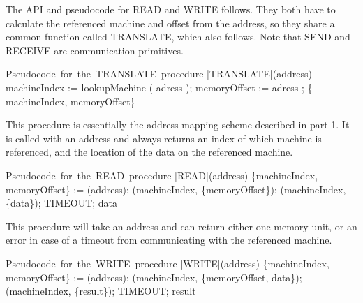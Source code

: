 \documentclass[11pt]{article}
\begin{document}

The API and pseudocode for READ and WRITE follows. They both have to calculate the referenced machine and offset from the address, so they share a common function called TRANSLATE, which also follows. Note that SEND and RECEIVE are communication primitives.


\begin{program}
\mbox{Pseudocode for the TRANSLATE procedure}
       \PROC |TRANSLATE|(address) \BODY
                 machineIndex := lookupMachine ( adress );
                 memoryOffset := adress \; \text{\%} \; ;
                  \; \{ machineIndex, memoryOffset\} \ENDPROC
\end{program}

This procedure is essentially the address mapping scheme described in part 1. It is called with an address and always returns an index of which machine is referenced, and the location of the data on the referenced machine.

\begin{program}
\mbox{Pseudocode for the READ procedure}
        \PROC |READ|(address) \BODY
               \{machineIndex, memoryOffset\} :=  (address);
                (machineIndex, \{memoryOffset\});
                \;  (machineIndex, \{data\});
                \; TIMEOUT;
                \; data \ENDPROC
\end{program}

This procedure will take an address and can return either one memory unit, or an error in case of a timeout from communicating with the referenced machine.
    
\begin{program}
\mbox{Pseudocode for the WRITE procedure}
        \PROC |WRITE|(address) \BODY
               \{machineIndex, memoryOffset\} :=  (address);
                (machineIndex, \{memoryOffset, data\});
                \;  (machineIndex, \{result\});
               \; TIMEOUT;
                \; result \ENDPROC
\end{program}
\end{document}
